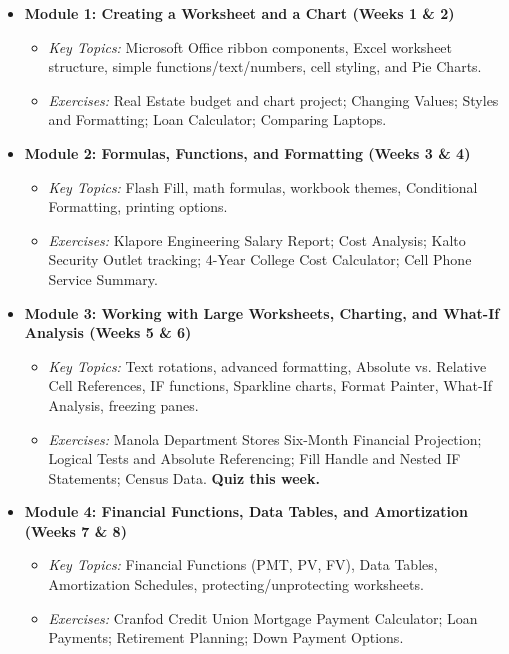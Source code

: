 \documentclass[11pt,a4paper]{article}
\begin{document}
\begin{itemize}[leftmargin=*]
    \item \textbf{Module 1: Creating a Worksheet and a Chart (Weeks 1 \& 2)}
    \begin{itemize}
        \item \textit{Key Topics:} Microsoft Office ribbon components, Excel worksheet structure, simple functions/text/numbers, cell styling, and Pie Charts.
        \item \textit{Exercises:} Real Estate budget and chart project; Changing Values; Styles and Formatting; Loan Calculator; Comparing Laptops.
    \end{itemize}
    
    \item \textbf{Module 2: Formulas, Functions, and Formatting (Weeks 3 \& 4)}
    \begin{itemize}
        \item \textit{Key Topics:} Flash Fill, math formulas, workbook themes, Conditional Formatting, printing options.
        \item \textit{Exercises:} Klapore Engineering Salary Report; Cost Analysis; Kalto Security Outlet tracking; 4-Year College Cost Calculator; Cell Phone Service Summary.
    \end{itemize}

    \item \textbf{Module 3: Working with Large Worksheets, Charting, and What-If Analysis (Weeks 5 \& 6)}
    \begin{itemize}
        \item \textit{Key Topics:} Text rotations, advanced formatting, Absolute vs. Relative Cell References, IF functions, Sparkline charts, Format Painter, What-If Analysis, freezing panes.
        \item \textit{Exercises:} Manola Department Stores Six-Month Financial Projection; Logical Tests and Absolute Referencing; Fill Handle and Nested IF Statements; Census Data. \textbf{Quiz this week.}
    \end{itemize}

    \item \textbf{Module 4: Financial Functions, Data Tables, and Amortization (Weeks 7 \& 8)}
    \begin{itemize}
        \item \textit{Key Topics:} Financial Functions (PMT, PV, FV), Data Tables, Amortization Schedules, protecting/unprotecting worksheets.
        \item \textit{Exercises:} Cranfod Credit Union Mortgage Payment Calculator; Loan Payments; Retirement Planning; Down Payment Options.
    \end{itemize}


\end{itemize}
\end{document}
